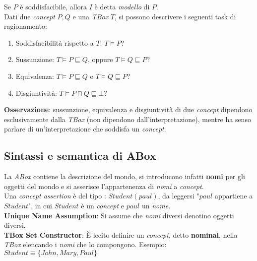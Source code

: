 Se $P$ è soddisfacibile, allora $I$ è detta \textit{modello} di $P$.
\\

Dati due \textit{concept} $P, Q$ e una \textit{TBox} $T$, si possono descrivere i seguenti task di ragionamento:
\begin{enumerate}
\item Soddisfacibilità rispetto a $T$: $T \models P$?
\item Sussunzione: $T \models P \sqsubseteq Q$, oppure $T \models Q \sqsubseteq P$?
\item Equivalenza: $T \models P \sqsubseteq Q$ e $T \models Q \sqsubseteq P$?
\item Disgiuntività: $T \models P \sqcap Q \sqsubseteq \bot$?
\end{enumerate}

\textbf{Osservazione}: sussunzione, equivalenza e disgiuntività di due \textit{concept} dipendono esclusivamente dalla \textit{TBox} (non dipendono dall'interpretazione), mentre ha senso parlare di un'interpretazione che soddisfa un \textit{concept}.

\subsection{Sintassi e semantica di ABox}
La \textit{ABox} contiene la descrizione del mondo, si introducono infatti \textbf{nomi} per gli oggetti del mondo e si asserisce l'appartenenza di \textit{nomi} a \textit{concept}.
\\

Una \textit{concept assertion} è del tipo : $Student(paul)$, da leggersi "$paul$ appartiene a $Student$", in cui $Student$ è un \textit{concept} e $paul$ un \textit{nome}.
\\

\textbf{Unique Name Assumption}: Si assume che \textit{nomi} diversi denotino oggetti diversi.
\\

\textbf{TBox Set Constructor}: È lecito definire un \textit{concept}, detto \textbf{nominal}, nella \textit{TBox} elencando i \textit{nomi} che lo compongono. Esempio: $Student \equiv \lbrace John, Mary, Paul \rbrace$

